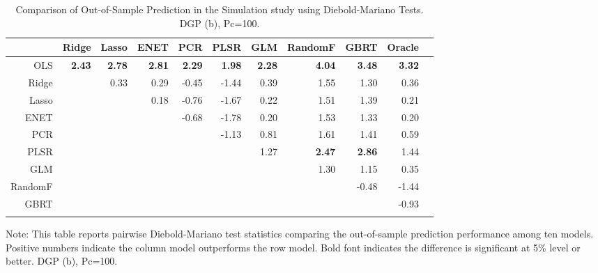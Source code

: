 \documentclass[11pt]{article}
\begin{document}
\begin{table}[H]
\begin{threeparttable}
\centering
\setlength{\tabcolsep}{5pt}
\caption{Comparison of Out-of-Sample Prediction in the Simulation study using Diebold-Mariano Tests. DGP (b), Pc=100.}
\centering
\begin{tabular}{r|rrrrrrrrrr}
  \Xhline{2\arrayrulewidth}
& Ridge & Lasso & ENET & PCR & PLSR & GLM & RandomF & GBRT & Oracle \\ 
  \hline
  OLS & \textbf{2.43} & \textbf{2.78} & \textbf{2.81} & \textbf{2.29} & \textbf{1.98} & \textbf{2.28} & \textbf{4.04} & \textbf{3.48} & \textbf{3.32} \\ 
  Ridge  && 0.33 & 0.29 & -0.45 & -1.44 & 0.39 & 1.55 & 1.30 & 0.36 \\ 
  Lasso  &&& 0.18 & -0.76 & -1.67 & 0.22 & 1.51 & 1.39 & 0.21 \\ 
  ENET  &&&& -0.68 & -1.78 & 0.20 & 1.53 & 1.33 & 0.20 \\ 
  PCR  &&&&& -1.13 & 0.81 & 1.61 & 1.41 & 0.59 \\ 
  PLSR  &&&&&& 1.27 & \textbf{2.47} & \textbf{2.86} & 1.44 \\ 
  GLM  &&&&&&& 1.30 & 1.15 & 0.35 \\ 
  RandomF &&&&&&&& -0.48 & -1.44 \\ 
  GBRT  &&&&&&&&& -0.93 \\ 
   \Xhline{2\arrayrulewidth}
\end{tabular}
\begin{tablenotes}
      \small
      \item Note: This table reports pairwise Diebold-Mariano test statistics comparing the out-of-sample prediction performance among ten models. Positive numbers indicate the column model outperforms the row model. Bold font indicates the difference is significant at 5\% level or better. DGP (b), Pc=100.
    \end{tablenotes}
  \end{threeparttable}
\label{table:dieboldsim4}
\end{table}
\end{document}
